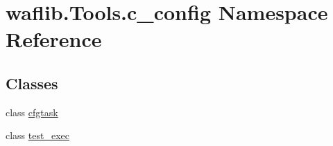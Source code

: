 \hypertarget{namespacewaflib_1_1_tools_1_1c__config}{}\section{waflib.\+Tools.\+c\+\_\+config Namespace Reference}
\label{namespacewaflib_1_1_tools_1_1c__config}
\subsection*{Classes}
\begin{DoxyCompactItemize}
\item 
class \hyperlink{classwaflib_1_1_tools_1_1c__config_1_1cfgtask}{cfgtask}
\item 
class \hyperlink{classwaflib_1_1_tools_1_1c__config_1_1test__exec}{test\+\_\+exec}
\end{DoxyCompactItemize}
